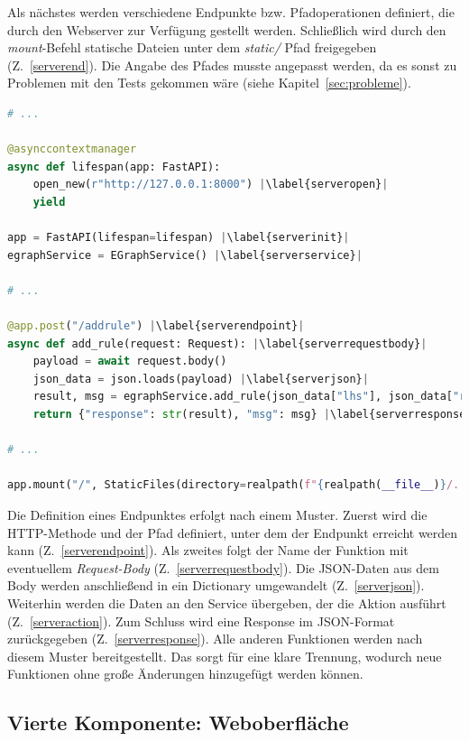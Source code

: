 Als nächstes werden verschiedene Endpunkte bzw. Pfadoperationen definiert, die durch den Webserver zur Verfügung gestellt werden. Schließlich wird durch den \textit{mount}-Befehl 
statische Dateien unter dem \textit{static/} Pfad freigegeben (Z.~\ref{serverend}). Die Angabe des Pfades musste angepasst werden, da es sonst zu Problemen mit
den Tests gekommen wäre (siehe Kapitel~\ref{sec:probleme}).

\begin{lstlisting}[language=Python, escapechar=|, caption=Auszug aus der Datei \textit{server.py}, label={lst:server}]
# ... 

@asynccontextmanager
async def lifespan(app: FastAPI):
    open_new(r"http://127.0.0.1:8000") |\label{serveropen}|
    yield

app = FastAPI(lifespan=lifespan) |\label{serverinit}|
egraphService = EGraphService() |\label{serverservice}|

# ... 

@app.post("/addrule") |\label{serverendpoint}|
async def add_rule(request: Request): |\label{serverrequestbody}|
    payload = await request.body()
    json_data = json.loads(payload) |\label{serverjson}|
    result, msg = egraphService.add_rule(json_data["lhs"], json_data["rhs"]) |\label{serveraction}|
    return {"response": str(result), "msg": msg} |\label{serverresponse}|

# ... 

app.mount("/", StaticFiles(directory=realpath(f"{realpath(__file__)}/../static"), html=True), name="static") |\label{serverend}|
\end{lstlisting} 

Die Definition eines Endpunktes erfolgt nach einem Muster. Zuerst wird die HTTP-Methode und der Pfad definiert, unter dem der Endpunkt erreicht werden kann (Z.~\ref{serverendpoint}).
Als zweites folgt der Name der Funktion mit eventuellem \textit{Request-Body} (Z.~\ref{serverrequestbody}).
Die JSON-Daten aus dem Body werden anschließend in ein Dictionary umgewandelt (Z.~\ref{serverjson}).
Weiterhin werden die Daten an den Service übergeben, der die Aktion ausführt (Z.~\ref{serveraction}).
Zum Schluss wird eine Response im JSON-Format zurückgegeben (Z.~\ref{serverresponse}).
Alle anderen Funktionen werden nach diesem Muster bereitgestellt. Das sorgt für eine klare Trennung, wodurch neue Funktionen ohne große Änderungen hinzugefügt werden können.

\subsection{Vierte Komponente: Weboberfläche}


